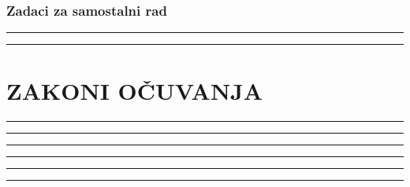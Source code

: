 \documentclass[10pt]{book}
\newcounter{zadatak} %
\newcounter{cjelina}
\begin{document}
\subsection*{Zadaci za samostalni rad}



\vspace{0.2cm}
\noindent

\vspace{0.2cm}


{\color{boja} \rule{\linewidth}{0.3mm} }

\vspace{0.2cm}
\noindent

\vspace{0.2cm}


{\color{boja} \rule{\linewidth}{0.3mm} }

\vspace{0.2cm}
\noindent

\vspace{0.2cm}

\newpage
\chapter{ZAKONI OČUVANJA}
\setcounter{zadatak}{0}



\noindent
{\color{boja} \rule{\linewidth}{0.3mm} }

\vspace{0.2cm} 



\noindent
{\color{boja} \rule{\linewidth}{0.3mm} }

\vspace{0.2cm}




\noindent
{\color{boja} \rule{\linewidth}{0.3mm} }


\vspace{1cm}

\noindent
{\color{boja} \rule{\linewidth}{0.3mm} }


\vspace{1cm}

\noindent
{\color{boja} \rule{\linewidth}{0.3mm} }


\vspace{1cm}

\noindent
{\color{boja} \rule{\linewidth}{0.3mm} }

\end{document}
